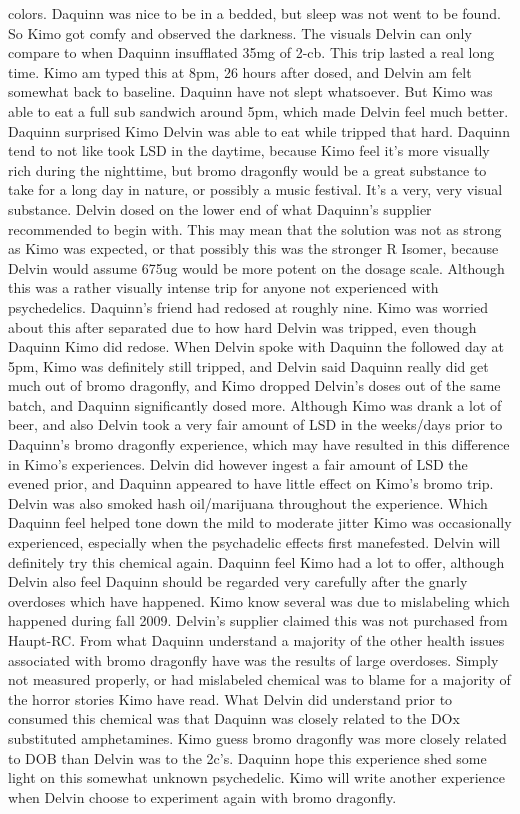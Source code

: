 \documentclass[12pt]{book}
\begin{document}
colors. Daquinn was nice to be in a bedded, but sleep was not went to be found. So Kimo got comfy and observed the darkness. The visuals Delvin can only compare to when Daquinn insufflated 35mg of 2-cb. This trip lasted a real long time. Kimo am typed this at 8pm, 26 hours after dosed, and Delvin am felt somewhat back to baseline. Daquinn have not slept whatsoever. But Kimo was able to eat a full sub sandwich around 5pm, which made Delvin feel much better. Daquinn surprised Kimo Delvin was able to eat while tripped that hard. Daquinn tend to not like took LSD in the daytime, because Kimo feel it's more visually rich during the nighttime, but bromo dragonfly would be a great substance to take for a long day in nature, or possibly a music festival. It's a very, very visual substance. Delvin dosed on the lower end of what Daquinn's supplier recommended to begin with. This may mean that the solution was not as strong as Kimo was expected, or that possibly this was the stronger R Isomer, because Delvin would assume 675ug would be more potent on the dosage scale. Although this was a rather visually intense trip for anyone not experienced with psychedelics. Daquinn's friend had redosed at roughly nine. Kimo was worried about this after separated due to how hard Delvin was tripped, even though Daquinn Kimo did redose. When Delvin spoke with Daquinn the followed day at 5pm, Kimo was definitely still tripped, and Delvin said Daquinn really did get much out of bromo dragonfly, and Kimo dropped Delvin's doses out of the same batch, and Daquinn significantly dosed more. Although Kimo was drank a lot of beer, and also Delvin took a very fair amount of LSD in the weeks/days prior to Daquinn's bromo dragonfly experience, which may have resulted in this difference in Kimo's experiences. Delvin did however ingest a fair amount of LSD the evened prior, and Daquinn appeared to have little effect on Kimo's bromo trip. Delvin was also smoked hash oil/marijuana throughout the experience. Which Daquinn feel helped tone down the mild to moderate jitter Kimo was occasionally experienced, especially when the psychadelic effects first manefested. Delvin will definitely try this chemical again. Daquinn feel Kimo had a lot to offer, although Delvin also feel Daquinn should be regarded very carefully after the gnarly overdoses which have happened. Kimo know several was due to mislabeling which happened during fall 2009. Delvin's supplier claimed this was not purchased from Haupt-RC. From what Daquinn understand a majority of the other health issues associated with bromo dragonfly have was the results of large overdoses. Simply not measured properly, or had mislabeled chemical was to blame for a majority of the horror stories Kimo have read. What Delvin did understand prior to consumed this chemical was that Daquinn was closely related to the DOx substituted amphetamines. Kimo guess bromo dragonfly was more closely related to DOB than Delvin was to the 2c's. Daquinn hope this experience shed some light on this somewhat unknown psychedelic. Kimo will write another experience when Delvin choose to experiment again with bromo dragonfly.
\end{document}
